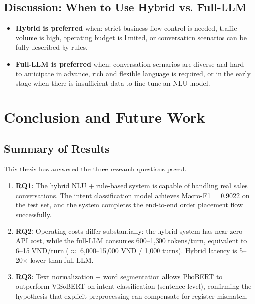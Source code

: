 \documentclass[12pt, a4paper]{report}
\begin{document}
\section{Discussion: When to Use Hybrid vs. Full-LLM}

\begin{itemize}
  \item \textbf{Hybrid is preferred} when: strict business flow control is needed,
        traffic volume is high, operating budget is limited,
        or conversation scenarios can be fully described by rules.
  \item \textbf{Full-LLM is preferred} when: conversation scenarios are diverse
        and hard to anticipate in advance, rich and flexible language is required,
        or in the early stage when there is insufficient data to fine-tune an NLU model.
\end{itemize}

\chapter*{Conclusion and Future Work}

\section*{Summary of Results}

This thesis has answered the three research questions posed:

\begin{enumerate}
  \item \textbf{RQ1:} The hybrid NLU + rule-based system is capable of handling
        real sales conversations. The intent classification model achieves
        Macro-F1 = 0.9022 on the test set, and the system completes
        the end-to-end order placement flow successfully.
  \item \textbf{RQ2:} Operating costs differ substantially:
        the hybrid system has near-zero API cost, while the full-LLM
        consumes 600--1,300 tokens/turn, equivalent to 6--15 VND/turn
        ($\approx$ 6,000--15,000 VND / 1,000 turns).
        Hybrid latency is 5--20$\times$ lower than full-LLM.
  \item \textbf{RQ3:} Text normalization + word segmentation allows PhoBERT
        to outperform ViSoBERT on intent classification (sentence-level),
        confirming the hypothesis that explicit preprocessing can
        compensate for register mismatch.
\end{enumerate}
\end{document}
